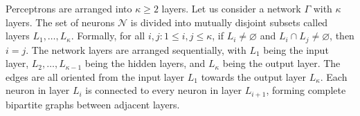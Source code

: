 \documentclass[a4paper]{report}
\begin{document}
{Perceptrons are arranged into $\kappa \geq 2$ layers. Let us consider a network \(\Gamma\) with \(\kappa\) layers. The set of neurons \(\mathcal{N}\) is divided into mutually disjoint subsets called layers \(L_1, \ldots, L_\kappa\). Formally, for all \(i, j: 1 \leq i, j \leq \kappa\), if \(L_i \neq \varnothing\) and \(L_i \cap L_j \neq \varnothing\), then \(i = j\). The network layers are arranged sequentially, with \(L_1\) being the input layer, \(L_2, \ldots, L_{\kappa-1}\) being the hidden layers, and \(L_\kappa\) being the output layer. The edges are all oriented from the input layer \(L_1\) towards the output layer \(L_\kappa\). Each neuron in layer \(L_i\) is connected to every neuron in layer \(L_{i+1}\), forming complete bipartite graphs between adjacent layers.

\begin{center}

\end{center}}
\end{document}
